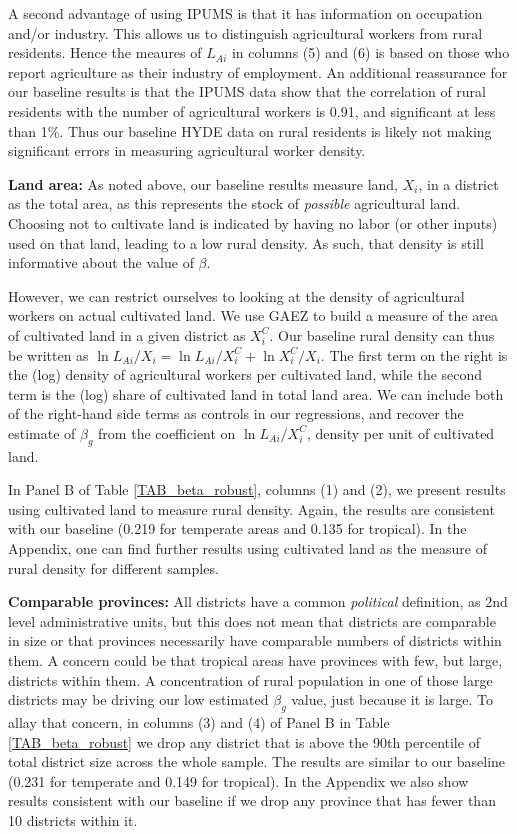 \documentclass[11pt]{article}
\begin{document}
A second advantage of using IPUMS is that it has information on occupation and/or industry. This allows us to distinguish agricultural workers from rural residents. Hence the meaures of $L_{Ai}$ in columns (5) and (6) is based on those who report agriculture as their industry of employment. An additional reassurance for our baseline results is that the IPUMS data show that the correlation of rural residents with the number of agricultural workers is 0.91, and significant at less than 1\%. Thus our baseline HYDE data on rural residents is likely not making significant errors in measuring agricultural worker density.

\vspace{.5cm}\noindent\textbf{Land area:} As noted above, our baseline results measure land, $X_i$, in a district as the total area, as this represents the stock of \textit{possible} agricultural land. Choosing not to cultivate land is indicated by having no labor (or other inputs) used on that land, leading to a low rural density. As such, that density is still informative about the value of $\beta$.

However, we can restrict ourselves to looking at the density of agricultural workers on actual cultivated land. We use GAEZ to build a measure of the area of cultivated land in a given district as $X^C_i$. Our baseline rural density can thus be written as $\ln L_{Ai}/X_i = \ln L_{Ai}/X_i^C + \ln X_i^C/X_i$. The first term on the right is the (log) density of agricultural workers per cultivated land, while the second term is the (log) share of cultivated land in total land area. We can include both of the right-hand side terms as controls in our regressions, and recover the estimate of $\beta_g$ from the coefficient on $\ln L_{Ai}/X_i^C$, density per unit of cultivated land.

In Panel B of Table \ref{TAB_beta_robust}, columns (1) and (2), we present results using cultivated land to measure rural density. Again, the results are consistent with our baseline (0.219 for temperate areas and 0.135 for tropical). In the Appendix, one can find further results using cultivated land as the measure of rural density for different samples.

\vspace{.5cm}\noindent\textbf{Comparable provinces:} All districts have a common \textit{political} definition, as 2nd level administrative units, but this does not mean that districts are comparable in size or that provinces necessarily have comparable numbers of districts within them. A concern could be that tropical areas have provinces with few, but large, districts within them. A concentration of rural population in one of those large districts may be driving our low estimated $\beta_g$ value, just because it is large. To allay that concern, in columns (3) and (4) of Panel B in Table \ref{TAB_beta_robust} we drop any district that is above the 90th percentile of total district size across the whole sample. The results are similar to our baseline (0.231 for temperate and 0.149 for tropical). In the Appendix we also show results consistent with our baseline if we drop any province that has fewer than 10 districts within it. 
\end{document}

